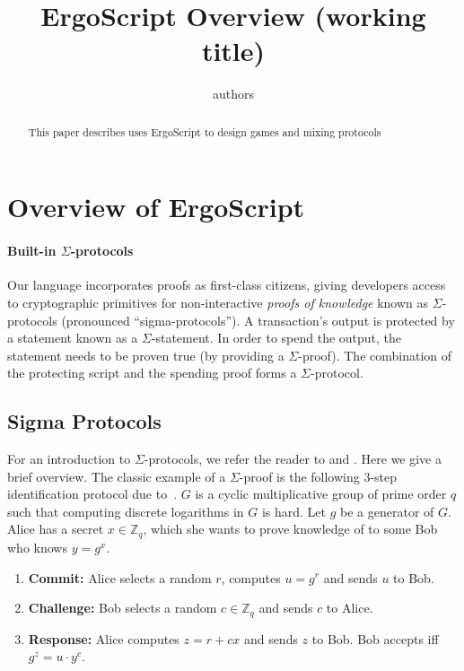 \documentclass[11pt]{article}
\newcommand{\langname}{ErgoScript\xspace}
\begin{document}
\title{\langname Overview (working title)}

\author{authors}


\maketitle


\begin{abstract}
This paper describes uses \langname to design games and mixing protocols
\end{abstract}
\section{Overview of \langname}

\paragraph{Built-in $\Sigma$-protocols}
Our language incorporates proofs as first-class citizens, giving developers access to cryptographic primitives for non-interactive {\em proofs of knowledge} known as $\Sigma$-protocols (pronounced ``sigma-protocols''). A transaction's output is protected by a statement known as a $\Sigma$-statement. In order to spend the output, the statement needs to be proven true (by providing a $\Sigma$-proof). The combination of the protecting script and the spending proof forms a $\Sigma$-protocol.

\subsection{Sigma Protocols}
For an introduction to $\Sigma$-protocols, we refer the reader to \cite{Dam10} and \cite[Chapter 6]{HL10}. Here we give a brief overview. The classic example of a $\Sigma$-proof is the following 3-step identification protocol due to~\cite{Sch91}. $G$ is a cyclic multiplicative group of prime order $q$ such that computing discrete logarithms in $G$ is hard. Let $g$ be a generator of $G$. Alice has a secret $x \in \mathbb{Z}_q$, which she wants to prove knowledge of to some Bob who knows $y = g^x$.
\begin{enumerate}
	\item \textbf{Commit:} Alice selects a random $r$, computes $u = g^r$ and sends $u$ to Bob.
	\item \textbf{Challenge:} Bob selects a random $c\in\mathbb{Z}_q$ and sends $c$ to Alice.
	\item \textbf{Response:} Alice computes $z = r + cx$ and sends $z$ to Bob. Bob accepts iff $g^z = u\cdot y^c$.
\end{enumerate}
\end{document}
